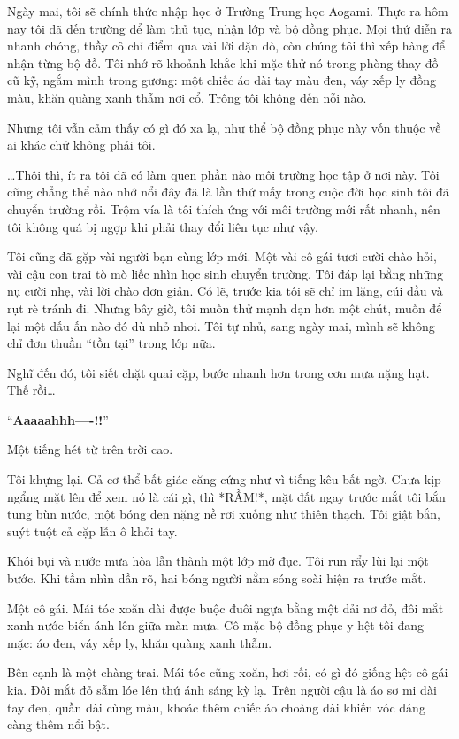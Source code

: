 \documentclass[../main.tex]{subfiles}
\begin{document}
Ngày mai, tôi sẽ chính thức nhập học ở Trường Trung học Aogami. Thực ra hôm nay tôi đã đến trường để làm thủ tục, nhận lớp và bộ đồng phục. Mọi thứ diễn ra nhanh chóng, thầy cô chỉ điểm qua vài lời dặn dò, còn chúng tôi thì xếp hàng để nhận từng bộ đồ. Tôi nhớ rõ khoảnh khắc khi mặc thử nó trong phòng thay đồ cũ kỹ, ngắm mình trong gương: một chiếc áo dài tay màu đen, váy xếp ly đồng màu, khăn quàng xanh thẫm nơi cổ. Trông tôi không đến nỗi nào.

Nhưng tôi vẫn cảm thấy có gì đó xa lạ, như thể bộ đồng phục này vốn thuộc về ai khác chứ không phải tôi.

\dots Thôi thì, ít ra tôi đã có làm quen phần nào môi trường học tập ở nơi này. Tôi cũng chẳng thể nào nhớ nổi đây đã là lần thứ mấy trong cuộc đời học sinh tôi đã chuyển trường rồi. Trộm vía là tôi thích ứng với môi trường mới rất nhanh, nên tôi không quá bị ngợp khi phải thay đổi liên tục như vậy.

Tôi cũng đã gặp vài người bạn cùng lớp mới. Một vài cô gái tươi cười chào hỏi, vài cậu con trai tò mò liếc nhìn học sinh chuyển trường. Tôi đáp lại bằng những nụ cười nhẹ, vài lời chào đơn giản. Có lẽ, trước kia tôi sẽ chỉ im lặng, cúi đầu và rụt rè tránh đi. Nhưng bây giờ, tôi muốn thử mạnh dạn hơn một chút, muốn để lại một dấu ấn nào đó dù nhỏ nhoi. Tôi tự nhủ, sang ngày mai, mình sẽ không chỉ đơn thuần ``tồn tại'' trong lớp nữa.

Nghĩ đến đó, tôi siết chặt quai cặp, bước nhanh hơn trong cơn mưa nặng hạt. Thế rồi\dots

``\textbf{Aaaaahhh----!!}''

Một tiếng hét từ trên trời cao.

Tôi khựng lại. Cả cơ thể bất giác căng cứng như vì tiếng kêu bất ngờ. Chưa kịp ngẩng mặt lên để xem nó là cái gì, thì *RẦM!*, mặt đất ngay trước mắt tôi bắn tung bùn nước, một bóng đen nặng nề rơi xuống như thiên thạch. Tôi giật bắn, suýt tuột cả cặp lẫn ô khỏi tay.

Khói bụi và nước mưa hòa lẫn thành một lớp mờ đục. Tôi run rẩy lùi lại một bước. Khi tầm nhìn dần rõ, hai bóng người nằm sóng soài hiện ra trước mắt.

Một cô gái. Mái tóc xoăn dài được buộc đuôi ngựa bằng một dải nơ đỏ, đôi mắt xanh nước biển ánh lên giữa màn mưa. Cô mặc bộ đồng phục y hệt tôi đang mặc: áo đen, váy xếp ly, khăn quàng xanh thẫm.

Bên cạnh là một chàng trai. Mái tóc cũng xoăn, hơi rối, có gì đó giống hệt cô gái kia. Đôi mắt đỏ sẫm lóe lên thứ ánh sáng kỳ lạ. Trên người cậu là áo sơ mi dài tay đen, quần dài cùng màu, khoác thêm chiếc áo choàng dài khiến vóc dáng càng thêm nổi bật.
\end{document}
